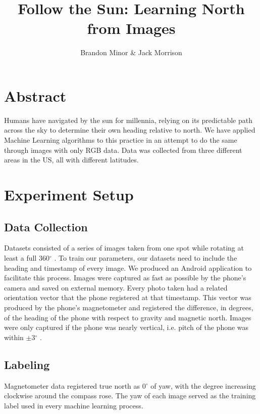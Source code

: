 \documentclass{article}
\begin{document}
\title{Follow the Sun: Learning North from Images}
\author{Brandon Minor \& Jack Morrison}
\maketitle


\newcommand{\degrees}{$^\circ$ }

\section{Abstract}

Humans have navigated by the sun for millennia, relying on its predictable path across the sky to determine their own heading relative to north. We have applied Machine Learning algorithms to this practice in an attempt to do the same through images with only RGB data. Data was collected from three different areas in the US, all with different latitudes. 

\section{Experiment Setup}

\subsection{Data Collection}
Datasets consisted of a series of images taken from one spot while rotating at least a full 360\degrees.
To train our parameters, our datasets need to include the heading and timestamp of every image. We produced an Android application to facilitate this process. Images were captured as fast as possible by the phone's camera and saved on external memory. Every photo taken had a related orientation vector that the phone registered at that timestamp. This vector was produced by the phone's magnetometer and registered the difference, in degrees, of the heading of the phone with respect to gravity and magnetic north. Images were only captured if the phone was nearly vertical, i.e. pitch of the phone was within $\pm$3\degrees.

\subsection{Labeling}
Magnetometer data registered true north as 0\degrees of yaw, with the degree increasing clockwise around the compass rose. The yaw of each image served as the training label used in every machine learning process. 
\end{document}
